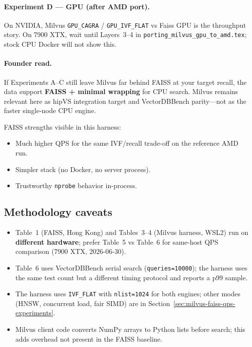 \documentclass[11pt,a4paper]{article}
\begin{document}
\paragraph{Experiment D --- GPU (after AMD port).}
On NVIDIA, Milvus \texttt{GPU\_CAGRA} / \texttt{GPU\_IVF\_FLAT} vs Faiss GPU is the
throughput story. On 7900 XTX, wait until Layers~3--4 in
\texttt{porting\_milvus\_gpu\_to\_amd.tex}; stock CPU Docker will not show this.

\paragraph{Founder read.}
If Experiments A--C still leave Milvus far behind FAISS at your target recall, the data
support \textbf{FAISS + minimal wrapping} for CPU search. Milvus remains relevant here as
hipVS integration target and VectorDBBench parity---not as the faster single-node CPU engine.

FAISS strengths visible in this harness:
\begin{itemize}[leftmargin=*]
  \item Much higher QPS for the same IVF/recall trade-off on the reference AMD run.
  \item Simpler stack (no Docker, no server process).
  \item Trustworthy \texttt{nprobe} behavior in-process.
\end{itemize}

\subsection{Methodology caveats}

\begin{itemize}[leftmargin=*]
  \item Table~1 (FAISS, Hong Kong) and Tables~3--4 (Milvus harness, WSL2) run on \textbf{different hardware};
        prefer Table~5 vs Table~6 for same-host QPS comparison (7900 XTX, 2026-06-30).
  \item Table~6 uses VectorDBBench serial search (\texttt{queries=10000}); the harness uses
        the same test count but a different timing protocol and reports a p99 sample.
  \item The harness uses \texttt{IVF\_FLAT} with \texttt{nlist=1024} for both engines; other
        modes (HNSW, concurrent load, fair SIMD) are in
        Section~\ref{sec:milvus-faiss-qps-experiments}.
  \item Milvus client code converts NumPy arrays to Python lists before search; this adds
        overhead not present in the FAISS baseline.
\end{itemize}
\end{document}
